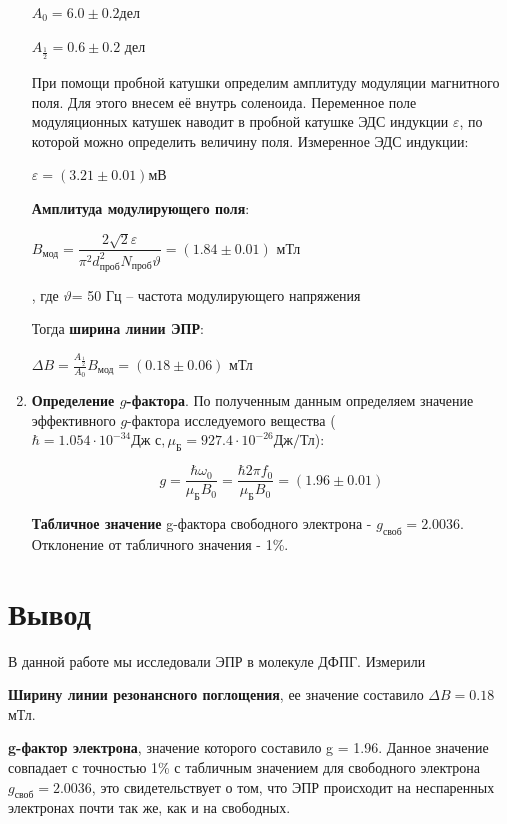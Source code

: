 \documentclass[12pt,a4paper]{article}
\begin{document}
\begin{enumerate}
    $A_{0} = 6.0 \pm 0.2 $дел
    
    $A_{\frac{1}{2}} = 0.6 \pm 0.2$ дел
    
    При помощи пробной катушки определим амплитуду модуляции магнитного поля. Для этого внесем её внутрь соленоида. Переменное поле модуляционных катушек наводит в пробной катушке ЭДС индукции $\varepsilon $, по которой можно определить величину поля. Измеренное ЭДС индукции: 
    
    $\varepsilon = (3.21 \pm  0.01)$мВ
    
     \textbf{Амплитуда модулирующего поля}:
    
    $B_{\text{мод}} = \dfrac{2\sqrt{2} \varepsilon }{\pi^2 d^2_{\text{проб}} N_{\text{проб}}\vartheta } = (1.84 \pm 0.01)$ мТл
    
    , где $\vartheta $= 50 Гц -- частота модулирующего напряжения 


  Тогда  \textbf{ширина линии ЭПР}:
  
  $\Delta B = \frac{A_{\frac{1}{2}}}{A_{0}} B_{\text{мод}} = (0.18 \pm 0.06)$ мТл
    
    
		\item \textbf{Определение $g$-фактора}. По полученным данным определяем значение эффективного $g$-фактора исследуемого вещества ($\hbar = 1.054 \cdot 10^{-34} \text{Дж с}, \mu_\text{Б} = 927.4 \cdot 10^{-26} \text{Дж/Тл}$):
		
		\[g = \frac{\hbar \omega_0}{\mu_\text{Б} B_0} = \frac{\hbar 2 \pi f_0}{\mu_\text{Б} B_0} = (1.96 \pm 0.01)\]

	
\textbf{Табличное значение} g-фактора свободного электрона - $g_{\text{своб}} = 2.0036$. Отклонение от табличного значения - 1\%.
	\end{enumerate}


\clearpage
    
\section*{Вывод}

В данной работе мы исследовали ЭПР в молекуле ДФПГ. Измерили 

\textbf{Ширину линии резонансного поглощения}, ее значение составило $\Delta B = 0.18$ мТл. 

\textbf{g-фактор электрона}, значение которого составило g = 1.96. Данное значение совпадает с точностью 1\% с табличным значением для свободного электрона $g_{\text{своб}} = 2.0036$, это свидетельствует о том, что ЭПР происходит на неспаренных электронах почти так же, как и на свободных.
\end{document}
